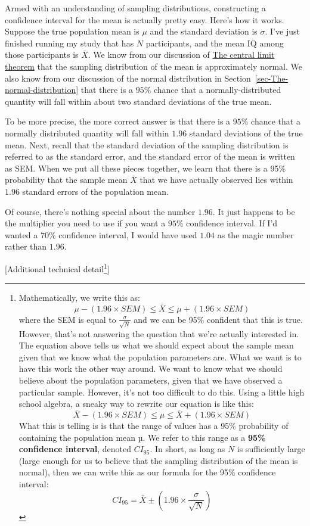 \documentclass[
  a4paper,
]{book}
\begin{document}
Armed with an understanding of sampling distributions, constructing a
confidence interval for the mean is actually pretty easy. Here's how it
works. Suppose the true population mean is \(\mu\) and the standard
deviation is \(\sigma\). I've just finished running my study that has
\(N\) participants, and the mean IQ among those participants is
\(\bar{X}\). We know from our discussion of
\protect\hyperlink{sec-The-central-limit-theorem}{The central limit
theorem} that the sampling distribution of the mean is approximately
normal. We also know from our discussion of the normal distribution in
Section~\ref{sec-The-normal-distribution} that there is a \(95\%\)
chance that a normally-distributed quantity will fall within about two
standard deviations of the true mean.

To be more precise, the more correct answer is that there is a \(95\%\)
chance that a normally distributed quantity will fall within \(1.96\)
standard deviations of the true mean. Next, recall that the standard
deviation of the sampling distribution is referred to as the standard
error, and the standard error of the mean is written as SEM. When we put
all these pieces together, we learn that there is a 95\% probability
that the sample mean \(\bar{X}\) that we have actually observed lies
within \(1.96\) standard errors of the population mean.

Of course, there's nothing special about the number \(1.96\). It just
happens to be the multiplier you need to use if you want a \(95\%\)
confidence interval. If I'd wanted a \(70\%\) confidence interval, I
would have used \(1.04\) as the magic number rather than \(1.96\).

{[}Additional technical detail\footnote{Mathematically, we write this
  as:
  \[\mu-(1.96 \times SEM ) \leq \bar{X} \leq \mu + (1.96 \times SEM)\]
  where the SEM is equal to \(\frac{\sigma}{\sqrt{N}}\) and we can be
  95\% confident that this is true. However, that's not answering the
  question that we're actually interested in. The equation above tells
  us what we should expect about the sample mean given that we know what
  the population parameters are. What we want is to have this work the
  other way around. We want to know what we should believe about the
  population parameters, given that we have observed a particular
  sample. However, it's not too difficult to do this. Using a little
  high school algebra, a sneaky way to rewrite our equation is like
  this:
  \[\bar{X}-(1.96 \times SEM ) \leq \mu \leq \bar{X}+(1.96 \times SEM )\]
  What this is telling is is that the range of values has a 95\%
  probability of containing the population mean µ. We refer to this
  range as a \textbf{95\% confidence interval}, denoted \(CI_{95}\). In
  short, as long as \(N\) is sufficiently large (large enough for us to
  believe that the sampling distribution of the mean is normal), then we
  can write this as our formula for the 95\% confidence interval:
  \[CI_{95}=\bar{X} \pm (1.96 \times \frac{\sigma}{\sqrt{N}})\]}{]}
\end{document}
